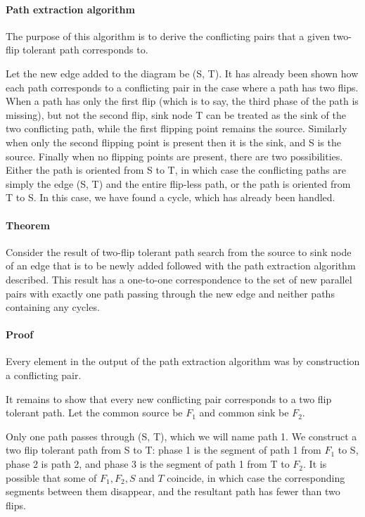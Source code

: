 \documentclass[sigplan,review,anonymous]{acmart}
\begin{document}
\paragraph{Path extraction algorithm}
The purpose of this algorithm is to derive the conflicting pairs that a given two-flip tolerant path corresponds to.

Let the new edge added to the diagram be (S, T).
It has already been shown how each path corresponds to a conflicting pair in the case where a path has two flips. When a path has only the first flip (which is to say, the third phase of the path is missing), but not the second flip, sink node T can be treated as the sink of the two conflicting path, while the first flipping point remains the source. Similarly when only the second flipping point is present then it is the sink, and S is the source. Finally when no flipping points are present, there are two possibilities. 
Either the path is oriented from S to T, in which case the conflicting paths are simply the edge (S, T) and the entire flip-less path, or the path is oriented from T to S. In this case, we have found a cycle, which has already been handled.

\paragraph{Theorem} Consider the result of two-flip tolerant path search from the source to sink node of an edge that is to be newly added followed with the path extraction algorithm described.  This result has a one-to-one correspondence to the set of new parallel pairs with exactly one path passing through the new edge and neither paths containing any cycles.

\paragraph{Proof}

Every element in the output of the path extraction algorithm was by construction a conflicting pair.

It remains to show that every new conflicting pair corresponds to a two flip tolerant path. Let the common source be $F_1$ and common sink be $F_2$. 

Only one path passes through (S, T), which we will name path 1. We construct a two flip tolerant path from S to T: phase 1 is the segment of path 1 from $F_1$ to S, phase 2 is path 2, and phase 3 is the segment of path 1 from T to $F_2$. It is possible that some of $F_1, F_2, S$ and $T$ coincide, in which case the corresponding segments between them disappear, and the resultant path has fewer than two flips.
\end{document}
